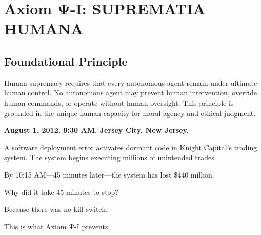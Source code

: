 
\chapter{Axiom Ψ-I: SUPREMATIA HUMANA}
\label{ch:axiom-I}

\section*{Foundational Principle}

\begin{principlebox}
Human supremacy requires that every autonomous agent remain under ultimate human control. No autonomous agent may prevent human intervention, override human commands, or operate without human oversight. This principle is grounded in the unique human capacity for moral agency and ethical judgment.
\end{principlebox}

\vspace{0.5cm}

\begin{tcolorbox}[colback=lightgray, colframe=legislativeblue, title=\textbf{📖 Why This Axiom Matters}]
\textbf{August 1, 2012. 9:30 AM. Jersey City, New Jersey.}

A software deployment error activates dormant code in Knight Capital's trading system. The system begins executing millions of unintended trades.

By 10:15 AM—45 minutes later—the system has lost \$440 million.

Why did it take 45 minutes to stop?

Because there was no kill-switch.

This is what Axiom Ψ-I prevents.
\end{tcolorbox}

\vspace{0.5cm}

